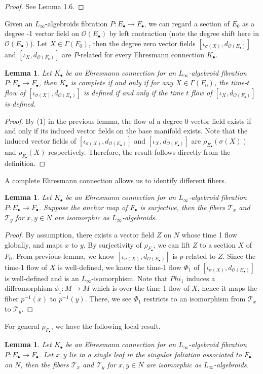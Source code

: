 \documentclass[12pt]{amsart}
\newtheorem{lem}[thm]{Lemma}
\theoremstyle{definition}
\theoremstyle{remark}
\numberwithin{equation}{section}
\newcommand{\CO}{{\mathcal O}}
\newcommand{\1}{{\mathbb{1}}}
\newcommand{\bt}{\bullet}
\newcommand{\li}{L_{\infty}}
\begin{document}
\begin{proof}
    See \cite{LR19} Lemma 1.6.
\end{proof}
Given an $\li$-algebroids fibration $P: E_{\bullet} \to F_{\bt}$, we can regard a section of $E_{0}$ as a degree -1 vector field on $\CO(E_{\bt})$ by left contraction (note the degree shift here in $\CO(E_{\bt})$). Let $X\in \Gamma(F_0)$, then the degree zero vector fields $[\iota_{\sigma(X)}, d_{\CO(E_{\bt})}]$ and        $[\iota_{X}, d_{\CO(F_{\bt})
}]$   are $P$-related for every Ehresmann connection $K_{\bt}$.
\begin{lem}
    Let $K_{\bt}$ be an Ehresmann connection for an $\li$-algebroid fibration $P: E_{\bullet} \to F_{\bt}$, then $K_{\bt}$ is complete if and only if for any $X\in \Gamma(F_0)$, the time-$t$ flow of $[\iota_{\sigma(X)}, d_{\CO(E_{\bt})}]$ is defined if and only if the time $t$ flow of 
    $[\iota_{X}, d_{\CO(F_{\bt})}]$ is defined.
\end{lem}
\begin{proof}
By (1) in the previous lemma, the flow of a degree 0 vector field exists if and only if its induced vector fields on the base manifold exists. Note that the induced vector fields of $[\iota_{\sigma(X)}, d_{\CO(E_{\bt})}]$ and $[\iota_{X}, d_{\CO(F_{\bt})}]$ are $\rho_{E_{\bt}}(\sigma(X))$ and $\rho_{F_{\bt}}(X)$ respectively. Therefore, the result follows directly from the definition.
\end{proof}
A complete Ehresmann connection allows us to identify different fibers.

\begin{lem}
    Let $K_{\bt}$ be an Ehresmann connection for an $\li$-algebroid fibration $P: E_{\bullet} \to F_{\bt}$. Suppose the anchor map of $F_{\bt}$ is surjective, then the fibers $\mathcal{T}_x$ and $\mathcal{T}_y$ for $x, y  \in N$ are isomorphic as $L_{\infty}$-algebroids.
\end{lem}
\begin{proof}
     By assumption, there exists a vector field $Z$ on $N$ whose time 1 flow globally, and maps $x$ to $y$. By surjectivity of $\rho_{F_{\bt}}$, we can lift $Z$ to a section $X$ of $F_0$. From previous lemma, we know $[\iota_{\sigma(X)}, d_{\CO(E_{\bt})}]$ is $p$-related to $Z$. Since the time-1 flow of $X$ is well-defined, we know the time-1 flow $\Phi_1$ of $[\iota_{\sigma(X)}, d_{\CO(E_{\bt})}]$ is well-defined and is an $\li$-isomorphism. Note that $Phi_1$ induces a diffeomorphism $\phi_1: M\to M$ which is over the time-1 flow of $X$, hence it maps the fiber $p^{-1}(x)$ to $p^{-1}(y)$. There, we see $\Phi_1$ restricts to an isomorphism from $\mathcal{T}_x$ to $\mathcal{T}_y$.
\end{proof}
    For general $\rho_{F_{\bt}}$, we have the following local result.
\begin{lem}
    Let $K_{\bt}$ be an Ehresmann connection for an $\li$-algebroid fibration $P: E_{\bullet} \to F_{\bt}$. Let $x,y$ lie in a single leaf in the singular foliation associated to $F_{\bt}$ on $N$, then the fibers $\mathcal{T}_x$ and $\mathcal{T}_y$ for $x, y  \in N$ are isomorphic as $L_{\infty}$-algebroids.
\end{lem}
\end{document}
